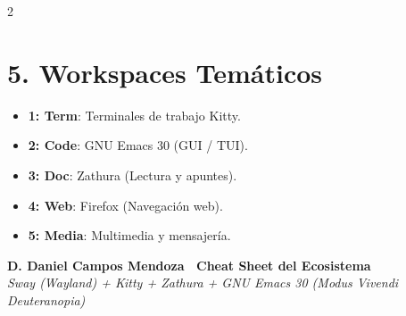 \documentclass[11pt,article,spanish]{apuntes-scr}
\begin{document}
\begin{multicols*}{2}
  \section*{5. Workspaces Temáticos}
  \begin{itemize}[leftmargin=*]
    \item \textbf{1: Term}: Terminales de trabajo Kitty.
    \item \textbf{2: Code}: GNU Emacs 30 (GUI / TUI).
    \item \textbf{3: Doc}: Zathura (Lectura y apuntes).
    \item \textbf{4: Web}: Firefox (Navegación web).
    \item \textbf{5: Media}: Multimedia y mensajería.
  \end{itemize}

\end{multicols*}

\vfill
\begin{center}
  {\Large\rmfamily\bfseries D. Daniel Campos Mendoza \textemdash\ Cheat Sheet del Ecosistema} \\[0.3em]
  {\small\rmfamily\itshape\color{MidnightBlue} Sway (Wayland) + Kitty + Zathura + GNU Emacs 30 (Modus Vivendi Deuteranopia)}
\end{center}
\end{document}
